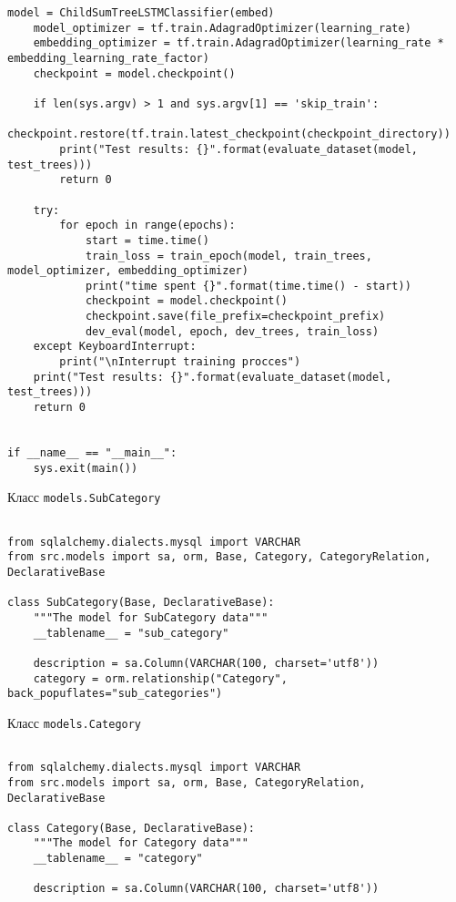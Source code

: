 \begin{lstlisting}[style=app]
    model = ChildSumTreeLSTMClassifier(embed)
    model_optimizer = tf.train.AdagradOptimizer(learning_rate)
    embedding_optimizer = tf.train.AdagradOptimizer(learning_rate * embedding_learning_rate_factor)
    checkpoint = model.checkpoint()

    if len(sys.argv) > 1 and sys.argv[1] == 'skip_train':
        checkpoint.restore(tf.train.latest_checkpoint(checkpoint_directory))
        print("Test results: {}".format(evaluate_dataset(model, test_trees)))
        return 0

    try:
        for epoch in range(epochs):
            start = time.time()
            train_loss = train_epoch(model, train_trees, model_optimizer, embedding_optimizer)
            print("time spent {}".format(time.time() - start))
            checkpoint = model.checkpoint()
            checkpoint.save(file_prefix=checkpoint_prefix)
            dev_eval(model, epoch, dev_trees, train_loss)
    except KeyboardInterrupt:
        print("\nInterrupt training procces")
    print("Test results: {}".format(evaluate_dataset(model, test_trees)))
    return 0


if __name__ == "__main__":
    sys.exit(main())
\end{lstlisting}

\begin{center}Класс \texttt{models.SubCategory}\end{center}

\begin{lstlisting}[style=app]

from sqlalchemy.dialects.mysql import VARCHAR
from src.models import sa, orm, Base, Category, CategoryRelation, DeclarativeBase

class SubCategory(Base, DeclarativeBase):
    """The model for SubCategory data"""
    __tablename__ = "sub_category"

    description = sa.Column(VARCHAR(100, charset='utf8'))
    category = orm.relationship("Category", back_popuflates="sub_categories")

\end{lstlisting}

\begin{center}Класс \texttt{models.Category}\end{center}

\begin{lstlisting}[style=app]

from sqlalchemy.dialects.mysql import VARCHAR
from src.models import sa, orm, Base, CategoryRelation, DeclarativeBase

class Category(Base, DeclarativeBase):
    """The model for Category data"""
    __tablename__ = "category"

    description = sa.Column(VARCHAR(100, charset='utf8'))

\end{lstlisting}

